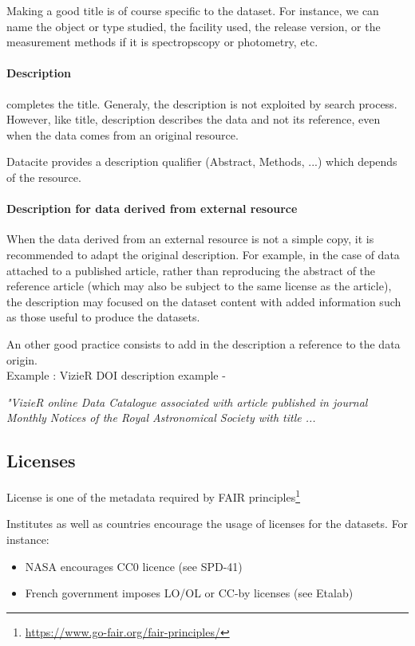\documentclass[11pt,a4paper]{ivoa}
\begin{document}
Making a good title is of course specific to the dataset. For instance, we can name the object or type studied, the facility used, the release version, or the measurement methods if it is spectropscopy or photometry, etc.


\paragraph{Description} completes the title. Generaly, the description is not exploited by search process. However, like title, description describes the data and not its reference, even when the data comes from an original resource.


Datacite provides a description qualifier (Abstract, Methods, ...) which depends of the resource.

\paragraph{Description for data derived from external resource}
When the data derived from an external resource is not a simple copy, it is recommended to adapt the original description. For example, in the case of data attached to a published article, rather than reproducing the abstract of the reference article (which may also be subject to the same license as the article), the description may focused on the dataset content with added information such as those useful to produce the datasets.


An other good practice consists to add in the description a reference to the data origin.\\


Example : VizieR DOI description example -

\textit{"VizieR online Data Catalogue associated with article published in journal Monthly Notices of the Royal Astronomical Society with title ... }

\subsection{Licenses}
\label{sec:licenses}
License is one of the metadata required by FAIR principles\footnote{\url{https://www.go-fair.org/fair-principles/}}

Institutes as well as countries encourage the usage of licenses for the datasets. For instance:
\begin{itemize}
\item NASA encourages CC0 licence (see SPD-41)
\item French government imposes LO/OL or CC-by licenses (see Etalab)
\end{itemize}
\end{document}
